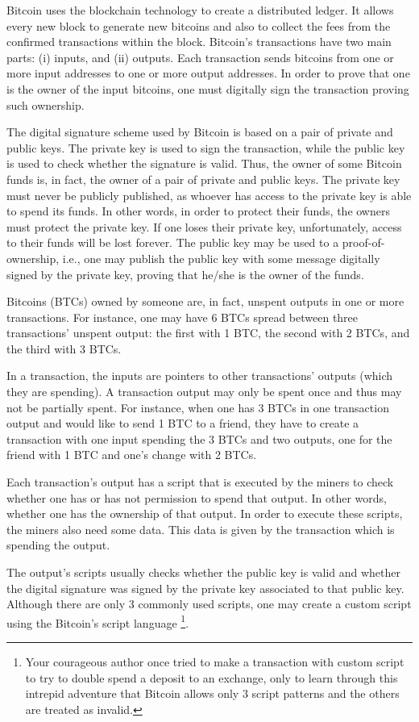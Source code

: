 Bitcoin uses the blockchain technology to create a distributed ledger. It allows every new block to generate new bitcoins and also to collect the fees from the confirmed transactions within the block. Bitcoin's transactions have two main parts: (i) inputs, and (ii) outputs. Each transaction sends bitcoins from one or more input addresses to one or more output addresses. In order to prove that one is the owner of the input bitcoins, one must digitally sign the transaction proving such ownership.

The digital signature scheme used by Bitcoin is based on a pair of private and public keys. The private key is used to sign the transaction, while the public key is used to check whether the signature is valid. Thus, the owner of some Bitcoin funds is, in fact, the owner of a pair of private and public keys. The private key must never be publicly published, as whoever has access to the private key is able to spend its funds. In other words, in order to protect their funds, the owners must protect the private key. If one loses their private key, unfortunately, access to their funds will be lost forever. The public key may be used to a proof-of-ownership, i.e., one may publish the public key with some message digitally signed by the private key, proving that he/she is the owner of the funds.

Bitcoins (BTCs) owned by someone are, in fact, unspent outputs in one or more transactions. For instance, one may have 6 BTCs spread between three transactions' unspent output: the first with 1 BTC, the second with 2 BTCs, and the third with 3 BTCs.

In a transaction, the inputs are pointers to other transactions' outputs (which they are spending). A transaction output may only be spent once and thus may not be partially spent. For instance, when one has 3 BTCs in one transaction output and would like to send 1 BTC to a friend, they have to create a transaction with one input spending the 3 BTCs and two outputs, one for the friend with 1 BTC and one's change with 2 BTCs. 

Each transaction's output has a script that is executed by the miners to check whether one has or has not permission to spend that output. In other words, whether one has the ownership of that output. In order to execute these scripts, the miners also need some data. This data is given by the transaction which is spending the output.

The output's scripts usually checks whether the public key is valid and whether the digital signature was signed by the private key associated to that public key. Although there are only 3 commonly used scripts, one may create a custom script using the Bitcoin's script language \footnote{Your courageous author once tried to make a transaction with custom script to try to double spend a deposit to an exchange, only to learn through this intrepid adventure that Bitcoin allows only 3 script patterns and the others are treated as invalid.}.

